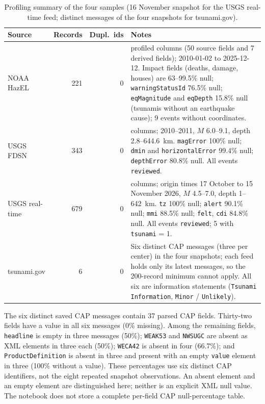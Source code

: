 \documentclass[a4paper,11pt,oneside]{book}
\begin{document}
\begin{table}[H]
\centering
\small
\begin{tabularx}{\textwidth}{@{}lrr>{\raggedright\arraybackslash}X@{}}
\toprule
Source & Records & Dupl.\ ids & Notes \\
\midrule
NOAA HazEL & 221 & 0 & 57 profiled columns (50 source fields and 7 derived fields); 2010-01-02 to 2025-12-12. Impact fields (deaths, damage, houses) are 63--99.5\% null; \texttt{warningStatusId} 76.5\% null; \texttt{eqMagnitude} and \texttt{eqDepth} 15.8\% null (tsunamis without an earthquake cause); 9 events without coordinates. \\
USGS FDSN & 343 & 0 & 24 columns; 2010--2011, $M$ 6.0--9.1, depth 2.8--644.6~km. \texttt{magError} 100\% null; \texttt{dmin} and \texttt{horizontalError} 99.4\% null; \texttt{depthError} 80.8\% null. All events \texttt{reviewed}. \\
USGS real-time & 679 & 0 & 32 columns; origin times 17 October to 15 November 2026, $M$ 4.5--7.0, depth 1--642~km. \texttt{tz} 100\% null; \texttt{alert} 90.1\% null; \texttt{mmi} 88.5\% null; \texttt{felt}, \texttt{cdi} 84.8\% null. All events \texttt{reviewed}; 5 with \texttt{tsunami} = 1. \\
tsunami.gov & 6 & 0 & Six distinct CAP messages (three per center) in the four snapshots; each feed holds only its latest messages, so the 200-record minimum cannot apply. All six are information statements (\texttt{Tsunami Information}, \texttt{Minor} / \texttt{Unlikely}). \\
\bottomrule
\end{tabularx}
\caption{Profiling summary of the four samples (16 November snapshot for the USGS real-time feed; distinct messages of the four snapshots for tsunami.gov).}
\label{tab:profile}
\end{table}

The six distinct saved CAP messages contain 37 parsed CAP fields. Thirty-two fields have a value in all six messages (0\% missing). Among the remaining fields, \texttt{headline} is empty in three messages (50\%); \texttt{WEAK53} and \texttt{NWSUGC} are absent as XML elements in three each (50\%); \texttt{WECA42} is absent in four (66.7\%); and \texttt{ProductDefinition} is absent in three and present with an empty \texttt{value} element in three (100\% without a value). These percentages use six distinct CAP identifiers, not the eight repeated snapshot observations. An absent element and an empty element are distinguished here; neither is an explicit XML null value. The notebook does not store a complete per-field CAP null-percentage table.
\end{document}
